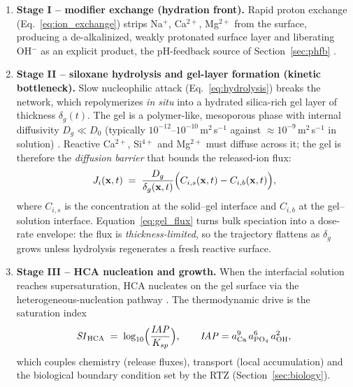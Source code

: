 \documentclass[11pt]{article}
\newcommand{\SIhc}{\mathit{SI}_{\mathrm{HCA}}}
\begin{document}
\begin{enumerate}[leftmargin=1.6em]
\item \textbf{Stage I -- modifier exchange (hydration front).} Rapid proton exchange (Eq.~\eqref{eq:ion_exchange}) strips Na$^{+}$, Ca$^{2+}$, Mg$^{2+}$ from the surface, producing a de-alkalinized, weakly protonated surface layer and liberating OH$^{-}$ as an explicit product, the pH-feedback source of Section~\ref{sec:phfb} \cite{Hench1996,Kokubo2006}.


\item \textbf{Stage II -- siloxane hydrolysis and gel-layer formation (kinetic bottleneck).} Slow nucleophilic attack (Eq.~\eqref{eq:hydrolysis}) breaks the network, which repolymerizes \emph{in situ} into a hydrated silica-rich gel layer of thickness $\delta_g(t)$. The gel is a polymer-like, mesoporous phase with internal diffusivity $D_g \ll D_0$ (typically $10^{-12}$--$10^{-10}$\,m$^{2}$\,s$^{-1}$ against $\approx10^{-9}$\,m$^{2}$\,s$^{-1}$ in solution) \cite{Hench1996,Rehman2018}. Reactive Ca$^{2+}$, Si$^{4+}$ and Mg$^{2+}$ must diffuse across it; the gel is therefore the \emph{diffusion barrier} that bounds the released-ion flux:
\begin{equation}
J_i(\mathbf{x},t) \;=\; \frac{D_g}{\delta_g(\mathbf{x},t)}\Bigl(C_{i,s}(\mathbf{x},t)-C_{i,b}(\mathbf{x},t)\Bigr),
\label{eq:gel_flux}
\end{equation}
where $C_{i,s}$ is the concentration at the solid--gel interface and $C_{i,b}$ at the gel--solution interface. Equation~\eqref{eq:gel_flux} turns bulk speciation into a dose-rate envelope: the flux is \emph{thickness-limited}, so the trajectory flattens as $\delta_g$ grows unless hydrolysis regenerates a fresh reactive surface.


\item \textbf{Stage III -- HCA nucleation and growth.} When the interfacial solution reaches supersaturation, HCA nucleates on the gel surface via the heterogeneous-nucleation pathway \cite{Hench1991,Kokubo2006}. The thermodynamic drive is the saturation index
\begin{equation}
\SIhc \;=\; \log_{10}\Bigl(\frac{\mathit{IAP}}{K_{sp}}\Bigr),\qquad
\mathit{IAP}=a_{\mathrm{Ca}}^{9}\,a_{\mathrm{PO_4}}^{6}\,a_{\mathrm{OH}}^{2},
\label{eq:SI}
\end{equation}
which couples chemistry (release fluxes), transport (local accumulation) and the biological boundary condition set by the RTZ (Section~\ref{sec:biology}).
\end{enumerate}
\end{document}
